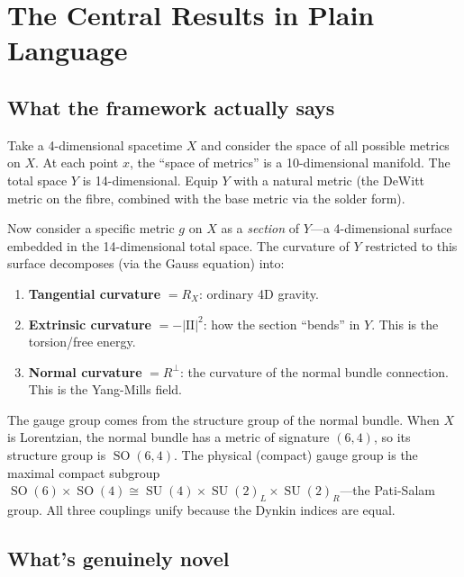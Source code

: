 \documentclass[12pt,a4paper]{article}
\DeclareMathOperator{\SO}{SO}
\DeclareMathOperator{\SU}{SU}
\begin{document}
\section{The Central Results in Plain Language}

\subsection{What the framework actually says}

Take a 4-dimensional spacetime $X$ and consider the space of all possible metrics on $X$. At each point $x$, the ``space of metrics'' is a 10-dimensional manifold. The total space $Y$ is 14-dimensional. Equip $Y$ with a natural metric (the DeWitt metric on the fibre, combined with the base metric via the solder form).

Now consider a specific metric $g$ on $X$ as a \textit{section} of $Y$---a 4-dimensional surface embedded in the 14-dimensional total space. The curvature of $Y$ restricted to this surface decomposes (via the Gauss equation) into:

\begin{enumerate}
\item \textbf{Tangential curvature} $= R_X$: ordinary 4D gravity.
\item \textbf{Extrinsic curvature} $= -|\mathrm{II}|^2$: how the section ``bends'' in $Y$. This is the torsion/free energy.
\item \textbf{Normal curvature} $= R^\perp$: the curvature of the normal bundle connection. This is the Yang-Mills field.
\end{enumerate}

The gauge group comes from the structure group of the normal bundle. When $X$ is Lorentzian, the normal bundle has a metric of signature $(6,4)$, so its structure group is $\SO(6,4)$. The physical (compact) gauge group is the maximal compact subgroup $\SO(6)\times\SO(4) \cong \SU(4)\times\SU(2)_L\times\SU(2)_R$---the Pati-Salam group. All three couplings unify because the Dynkin indices are equal.

\subsection{What's genuinely novel}
\end{document}
